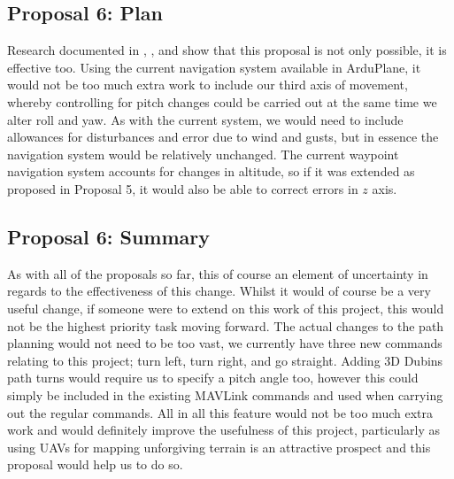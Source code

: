 \subsection{Proposal 6: Plan} 
\label{future:3dplan}

Research documented in \cite{beard2013implementing}, \cite{hota2010optimal}, and \cite{lin2014path} show that this proposal is not only possible, it is effective too. Using the current navigation system available in ArduPlane, it would not be too much extra work to include our third axis of movement, whereby controlling for pitch changes could be carried out at the same time we alter roll and yaw. As with the current system, we would need to include allowances for disturbances and error due to wind and gusts, but in essence the navigation system would be relatively unchanged. The current waypoint navigation system accounts for changes in altitude, so if it was extended as proposed in Proposal 5, it would also be able to correct errors in $z$ axis. 

\subsection{Proposal 6: Summary} 
\label{future:3dsummary}

As with all of the proposals so far, this of course an element of uncertainty in regards to the effectiveness of this change. Whilst it would of course be a very useful change, if someone were to extend on this work of this project, this would not be the highest priority task moving forward. The actual changes to the path planning would not need to be too vast, we currently have three new commands relating to this project; turn left, turn right, and go straight. Adding 3D Dubins path turns would require us to specify a pitch angle too, however this could simply be included in the existing MAVLink commands and used when carrying out the regular commands. All in all this feature would not be too much extra work and would definitely improve the usefulness of this project, particularly as using UAVs for mapping unforgiving terrain is an attractive prospect and this proposal would help us to do so.

